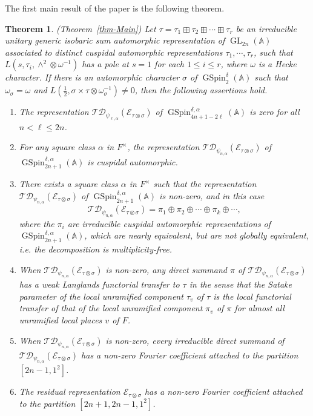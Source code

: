 \documentclass[12pt]{amsart}
\newcommand{\A}{\mathbb{A}}
\newcommand{\TD}{\mathcal{TD}}
\newcommand{\CE}{{\mathcal{E}}}
\newtheorem{theorem}{Theorem}[section]
\theoremstyle{remark}
\DeclareMathOperator{\GL}{GL}
\DeclareMathOperator{\GSpin}{GSpin}
\begin{document}
The first main result of the paper is the following theorem. 

\begin{theorem}\label{Intro-thm-Main}(Theorem~\ref{thm-Main})
 Let $\tau=\tau_1\boxplus \tau_2\boxplus \cdots \boxplus \tau_r$ be an irreducible unitary generic isobaric sum automorphic representation of $\GL_{2n}(\A)$ associated to distinct cuspidal automorphic representations $\tau_1, \cdots, \tau_r$, such that $L(s, \tau_i, \wedge^2\otimes\omega^{-1})$ has a pole at $s=1$ for each $1\le i\le r$, where $\omega$ is a Hecke character. 
 If there is an automorphic character $\sigma$ of $\GSpin^\delta_2(\A)$ such that $\omega_{\sigma}=\omega$ and 
 $L(\frac{1}{2}, \sigma\times \tau\otimes \omega_\sigma^{-1})\neq 0$, then the following assertions hold.
\begin{enumerate}
\item The representation $\TD_{\psi_{\ell,\alpha}}(\CE_{\tau\otimes\sigma})$ of $\GSpin^{\delta,\alpha}_{4n+1-2\ell}(\A)$ is zero
for all $n<\ell\leq 2n$.
\item For any square class $\alpha$ in $F^\times$, the representation $\TD_{\psi_{n,\alpha}}(\CE_{\tau\otimes\sigma})$ of $\GSpin^{\delta,\alpha}_{2n+1}(\A)$ is cuspidal automorphic.
\item There exists a square class $\alpha$ in $F^\times$ such that the representation $\TD_{\psi_{n,\alpha}}(\CE_{\tau\otimes\sigma})$ of $\GSpin^{\delta,\alpha}_{2n+1}(\A)$ is non-zero, and in this case
    $$
    \TD_{\psi_{n,\alpha}}(\CE_{\tau\otimes\sigma})=\pi_1\oplus\pi_2\oplus\cdots\oplus\pi_k\oplus\cdots,
    $$
    where the $\pi_i$ are irreducible cuspidal automorphic representations of $\GSpin^{\delta,\alpha}_{2n+1}(\A)$, which are nearly equivalent, but
    are not globally equivalent, i.e. the decomposition is multiplicity-free.
\item When $\TD_{\psi_{n,\alpha}}(\CE_{\tau\otimes\sigma})$ is non-zero, any direct summand $\pi$ of $\TD_{\psi_{n,\alpha}}(\CE_{\tau\otimes\sigma})$ has a weak Langlands functorial transfer to $\tau$ in the sense that the Satake parameter of the local unramified component $\tau_v$ of $\tau$ is the local functorial transfer of that of the local unramified component $\pi_v$ of $\pi$ for almost all unramified local places $v$ of $F$.
\item When $\TD_{\psi_{n,\alpha}}(\CE_{\tau\otimes\sigma})$ is non-zero, every irreducible direct summand of $\TD_{\psi_{n,\alpha}}(\CE_{\tau\otimes\sigma})$ has a non-zero Fourier coefficient attached to the partition $[2n-1,1^2]$.  
\item The residual representation $\CE_{\tau\otimes\sigma}$ has a non-zero Fourier coefficient attached to the partition $[2n+1,2n-1,1^2]$.  
\end{enumerate}
\end{theorem}
\end{document}
